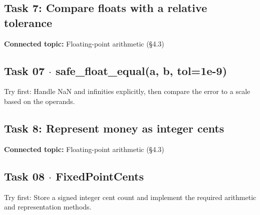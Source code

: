 \documentclass[11pt]{article}
\begin{document}
\begin{keepsection}
\section{Task 7: Compare floats with a relative tolerance}

\textbf{Connected topic:} Floating-point arithmetic (§4.3)

\begin{keepsection}
\subsection{Task 07 \ensuremath{\cdot} safe\_float\_equal(a, b, tol=1e-9)}

Try first: Handle NaN and infinities explicitly, then compare the error to a scale based on the operands.

\end{keepsection}
\end{keepsection}

\begin{keepsection}
\section{Task 8: Represent money as integer cents}

\textbf{Connected topic:} Floating-point arithmetic (§4.3)

\begin{keepsection}
\subsection{Task 08 \ensuremath{\cdot} FixedPointCents}

Try first: Store a signed integer cent count and implement the required arithmetic and representation methods.

\end{keepsection}
\end{keepsection}
\end{document}
